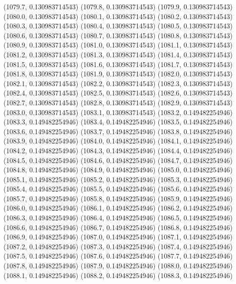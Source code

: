{					(1079.7, 0.130983714543)
					(1079.8, 0.130983714543)
					(1079.9, 0.130983714543)
					(1080.0, 0.130983714543)
					(1080.1, 0.130983714543)
					(1080.2, 0.130983714543)
					(1080.3, 0.130983714543)
					(1080.4, 0.130983714543)
					(1080.5, 0.130983714543)
					(1080.6, 0.130983714543)
					(1080.7, 0.130983714543)
					(1080.8, 0.130983714543)
					(1080.9, 0.130983714543)
					(1081.0, 0.130983714543)
					(1081.1, 0.130983714543)
					(1081.2, 0.130983714543)
					(1081.3, 0.130983714543)
					(1081.4, 0.130983714543)
					(1081.5, 0.130983714543)
					(1081.6, 0.130983714543)
					(1081.7, 0.130983714543)
					(1081.8, 0.130983714543)
					(1081.9, 0.130983714543)
					(1082.0, 0.130983714543)
					(1082.1, 0.130983714543)
					(1082.2, 0.130983714543)
					(1082.3, 0.130983714543)
					(1082.4, 0.130983714543)
					(1082.5, 0.130983714543)
					(1082.6, 0.130983714543)
					(1082.7, 0.130983714543)
					(1082.8, 0.130983714543)
					(1082.9, 0.130983714543)
					(1083.0, 0.130983714543)
					(1083.1, 0.130983714543)
					(1083.2, 0.149482254946)
					(1083.3, 0.149482254946)
					(1083.4, 0.149482254946)
					(1083.5, 0.149482254946)
					(1083.6, 0.149482254946)
					(1083.7, 0.149482254946)
					(1083.8, 0.149482254946)
					(1083.9, 0.149482254946)
					(1084.0, 0.149482254946)
					(1084.1, 0.149482254946)
					(1084.2, 0.149482254946)
					(1084.3, 0.149482254946)
					(1084.4, 0.149482254946)
					(1084.5, 0.149482254946)
					(1084.6, 0.149482254946)
					(1084.7, 0.149482254946)
					(1084.8, 0.149482254946)
					(1084.9, 0.149482254946)
					(1085.0, 0.149482254946)
					(1085.1, 0.149482254946)
					(1085.2, 0.149482254946)
					(1085.3, 0.149482254946)
					(1085.4, 0.149482254946)
					(1085.5, 0.149482254946)
					(1085.6, 0.149482254946)
					(1085.7, 0.149482254946)
					(1085.8, 0.149482254946)
					(1085.9, 0.149482254946)
					(1086.0, 0.149482254946)
					(1086.1, 0.149482254946)
					(1086.2, 0.149482254946)
					(1086.3, 0.149482254946)
					(1086.4, 0.149482254946)
					(1086.5, 0.149482254946)
					(1086.6, 0.149482254946)
					(1086.7, 0.149482254946)
					(1086.8, 0.149482254946)
					(1086.9, 0.149482254946)
					(1087.0, 0.149482254946)
					(1087.1, 0.149482254946)
					(1087.2, 0.149482254946)
					(1087.3, 0.149482254946)
					(1087.4, 0.149482254946)
					(1087.5, 0.149482254946)
					(1087.6, 0.149482254946)
					(1087.7, 0.149482254946)
					(1087.8, 0.149482254946)
					(1087.9, 0.149482254946)
					(1088.0, 0.149482254946)
					(1088.1, 0.149482254946)
					(1088.2, 0.149482254946)
					(1088.3, 0.149482254946)
}
